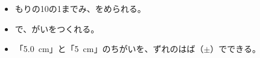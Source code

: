 
\begin{goal}
\begin{itemize}[label={\color{bkTheme}●}, leftmargin=1.6\zw, itemsep=0pt, topsep=1pt]
\item {}\enspace {}もりの10の1までみ、をめられる。
\item {}\enspace {}で、がいをつくれる。
\item {}\enspace 「\qty{5.0}{cm}」と「\qty{5}{cm}」のちがいを、ずれのはば（$\pm$）でできる。
\end{itemize}
\end{goal}

